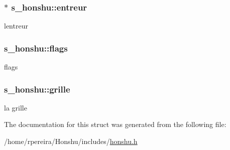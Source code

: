 \subsubsection[{\texorpdfstring{entreur}{entreur}}]{$\ast$ s\+\_\+honshu\+::entreur}\hypertarget{structs__honshu_aea4f7876bf6ca3a4137dcf5d6f845077}{}\label{structs__honshu_aea4f7876bf6ca3a4137dcf5d6f845077}
l\textquotesingle{}entreur 
\subsubsection[{\texorpdfstring{flags}{flags}}]{ s\+\_\+honshu\+::flags}\hypertarget{structs__honshu_a3b5f869819428973745541c16b5d7c1a}{}\label{structs__honshu_a3b5f869819428973745541c16b5d7c1a}
flags 
\subsubsection[{\texorpdfstring{grille}{grille}}]{ s\+\_\+honshu\+::grille}\hypertarget{structs__honshu_acb56018a76f879eaf840281ef7522628}{}\label{structs__honshu_acb56018a76f879eaf840281ef7522628}
la grille 

The documentation for this struct was generated from the following file\+:\begin{DoxyCompactItemize}
\item 
/home/rpereira/\+Honshu/includes/\hyperlink{honshu_8h}{honshu.\+h}\end{DoxyCompactItemize}
